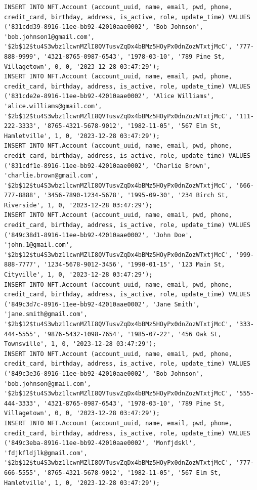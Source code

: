 \documentclass[a4paper, 12pt]{article}
\begin{document}
\begin{lstlisting}
INSERT INTO NFT.Account (account_uuid, name, email, pwd, phone, credit_card, birthday, address, is_active, role, update_time) VALUES ('831cdd39-8916-11ee-bb92-42010aae0002', 'Bob Johnson', 'bob.johnson1@gmail.com', '$2b$12$tu4S3wbz1lcwnMZlI8QVTusvZqDx4bBMz5HOyPx0dnZozWTxtjMcC', '777-888-9999', '4321-8765-0987-6543', '1978-03-10', '789 Pine St, Villagetown', 0, 0, '2023-12-28 03:47:29');
INSERT INTO NFT.Account (account_uuid, name, email, pwd, phone, credit_card, birthday, address, is_active, role, update_time) VALUES ('831cde2e-8916-11ee-bb92-42010aae0002', 'Alice Williams', 'alice.williams@gmail.com', '$2b$12$tu4S3wbz1lcwnMZlI8QVTusvZqDx4bBMz5HOyPx0dnZozWTxtjMcC', '111-222-3333', '8765-4321-5678-9012', '1982-11-05', '567 Elm St, Hamletville', 1, 0, '2023-12-28 03:47:29');
INSERT INTO NFT.Account (account_uuid, name, email, pwd, phone, credit_card, birthday, address, is_active, role, update_time) VALUES ('831cdf1e-8916-11ee-bb92-42010aae0002', 'Charlie Brown', 'charlie.brown@gmail.com', '$2b$12$tu4S3wbz1lcwnMZlI8QVTusvZqDx4bBMz5HOyPx0dnZozWTxtjMcC', '666-777-8888', '3456-7890-1234-5678', '1995-09-30', '234 Birch St, Riverside', 1, 0, '2023-12-28 03:47:29');
INSERT INTO NFT.Account (account_uuid, name, email, pwd, phone, credit_card, birthday, address, is_active, role, update_time) VALUES ('849c38d1-8916-11ee-bb92-42010aae0002', 'John Doe', 'john.1@gmail.com', '$2b$12$tu4S3wbz1lcwnMZlI8QVTusvZqDx4bBMz5HOyPx0dnZozWTxtjMcC', '999-888-7777', '1234-5678-9012-3456', '1990-01-15', '123 Main St, Cityville', 1, 0, '2023-12-28 03:47:29');
INSERT INTO NFT.Account (account_uuid, name, email, pwd, phone, credit_card, birthday, address, is_active, role, update_time) VALUES ('849c3d7c-8916-11ee-bb92-42010aae0002', 'Jane Smith', 'jane.smith@gmail.com', '$2b$12$tu4S3wbz1lcwnMZlI8QVTusvZqDx4bBMz5HOyPx0dnZozWTxtjMcC', '333-444-5555', '9876-5432-1098-7654', '1985-07-22', '456 Oak St, Townsville', 1, 0, '2023-12-28 03:47:29');
INSERT INTO NFT.Account (account_uuid, name, email, pwd, phone, credit_card, birthday, address, is_active, role, update_time) VALUES ('849c3e36-8916-11ee-bb92-42010aae0002', 'Bob Johnson', 'bob.johnson@gmail.com', '$2b$12$tu4S3wbz1lcwnMZlI8QVTusvZqDx4bBMz5HOyPx0dnZozWTxtjMcC', '555-444-3333', '4321-8765-0987-6543', '1978-03-10', '789 Pine St, Villagetown', 0, 0, '2023-12-28 03:47:29');
INSERT INTO NFT.Account (account_uuid, name, email, pwd, phone, credit_card, birthday, address, is_active, role, update_time) VALUES ('849c3eba-8916-11ee-bb92-42010aae0002', 'Monfjdskl', 'fdjkfldjlk@gmail.com', '$2b$12$tu4S3wbz1lcwnMZlI8QVTusvZqDx4bBMz5HOyPx0dnZozWTxtjMcC', '777-666-5555', '8765-4321-5678-9012', '1982-11-05', '567 Elm St, Hamletville', 1, 0, '2023-12-28 03:47:29');

\end{lstlisting}
\end{document}

